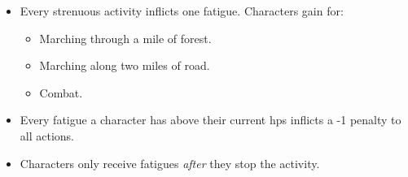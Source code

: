 \begin{itemize}
  \item
  Every strenuous activity inflicts one \gls{fatigue}.
  Characters gain  for:
  \begin{itemize}
    \item
    Marching through a mile of forest.
    \item
    Marching along two miles of road.
    \item
    Combat.
  \end{itemize}
  \item
  Every \gls{fatigue} a character has above their current \glspl{hp} inflicts a -1 penalty to all actions.
  \item
  Characters only receive \glspl{fatigue} \emph{after} they stop the activity.
\end{itemize}
